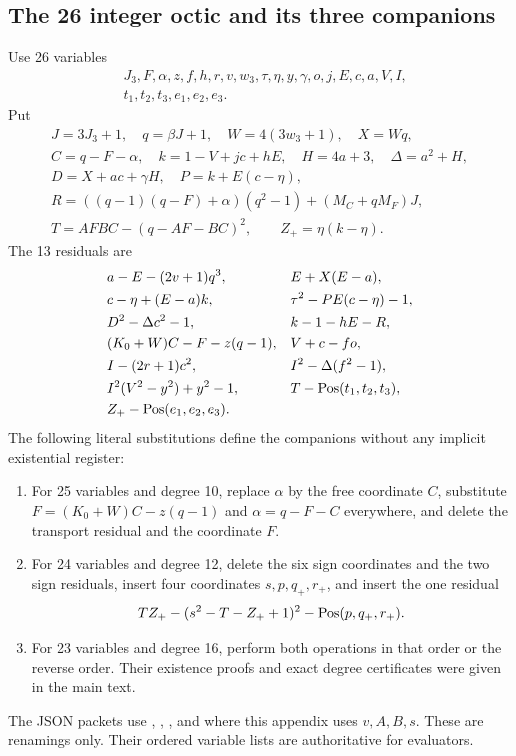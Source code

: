 \subsection{The 26 integer octic and its three companions}
Use 26 variables
\[
\begin{split}
&J_3,F,\alpha,z,f,h,r,v,w_3,\tau,\eta,y,\gamma,o,j,E,c,a,V,I,\\
&t_1,t_2,t_3,e_1,e_2,e_3.
\end{split}
\]
Put
\[
\begin{gathered}
 J=3J_3+1,\quad q=\beta J+1,\quad W=4(3w_3+1),\quad X=Wq,\\
 C=q-F-\alpha,\quad k=1-V+jc+hE,\quad H=4a+3,\quad
 \Delta=a^2+H,\\
 D=X+ac+\gamma H,\quad P=k+E(c-\eta),\\
 R=((q-1)(q-F)+\alpha)(q^2-1)+(M_C+qM_F)J,\\
 T=AFBC-(q-AF-BC)^2,\qquad Z_+=\eta(k-\eta).
\end{gathered}
\]
The 13 residuals are
\begin{align*}
 &a-E-(2v+1)q^3,&& E+X(E-a),\\
 &c-\eta+(E-a)k,&& \tau^2-PE(c-\eta)-1,\\
 &D^2-\Delta c^2-1,&& k-1-hE-R,\\
 &(K_0+W)C-F-z(q-1),&& V+c-fo,\\
 &I-(2r+1)c^2,&& I^2-\Delta(f^2-1),\\
 &I^2(V^2-y^2)+y^2-1,&& T-\operatorname{Pos}(t_1,t_2,t_3),\\
 &Z_+-\operatorname{Pos}(e_1,e_2,e_3).&&
\end{align*}
The following literal substitutions define the companions without any
implicit existential register:
\begin{enumerate}
\item For 25 variables and degree 10, replace $\alpha$ by the free
coordinate $C$, substitute $F=(K_0+W)C-z(q-1)$ and
$\alpha=q-F-C$ everywhere, and delete the transport residual and the
coordinate $F$.
\item For 24 variables and degree 12, delete the six sign coordinates
and the two sign residuals, insert four coordinates $s,p,q_+,r_+$, and
insert the one residual
\[
 TZ_+-(s^2-T-Z_++1)^2-\operatorname{Pos}(p,q_+,r_+).
\]
\item For 23 variables and degree 16, perform both operations in that
order or the reverse order. Their existence proofs and exact degree
certificates were given in the main text.
\end{enumerate}
The JSON packets use , , ,
and  where this appendix uses $v,A,B,s$. These are renamings
only. Their ordered variable lists are authoritative for evaluators.
